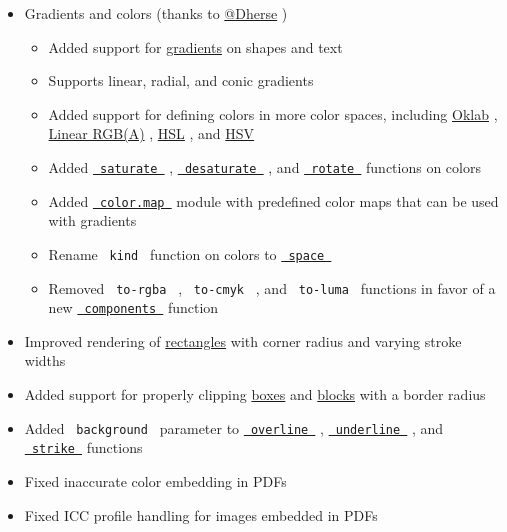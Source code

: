 \begin{itemize}
\tightlist
\item
  Gradients and colors (thanks to
  \href{https://github.com/Dherse}{@Dherse} )

  \begin{itemize}
  \tightlist
  \item
    Added support for
    \href{/docs/reference/visualize/gradient/}{gradients} on shapes and
    text
  \item
    Supports linear, radial, and conic gradients
  \item
    Added support for defining colors in more color spaces, including
    \href{/docs/reference/visualize/color/\#definitions-oklab}{Oklab} ,
    \href{/docs/reference/visualize/color/\#definitions-linear-rgb}{Linear
    RGB(A)} ,
    \href{/docs/reference/visualize/color/\#definitions-hsl}{HSL} , and
    \href{/docs/reference/visualize/color/\#definitions-hsv}{HSV}
  \item
    Added
    \href{/docs/reference/visualize/color/\#definitions-saturate}{\texttt{\ saturate\ }}
    ,
    \href{/docs/reference/visualize/color/\#definitions-desaturate}{\texttt{\ desaturate\ }}
    , and
    \href{/docs/reference/visualize/color/\#definitions-rotate}{\texttt{\ rotate\ }}
    functions on colors
  \item
    Added
    \href{/docs/reference/visualize/color/\#predefined-color-maps}{\texttt{\ color.map\ }}
    module with predefined color maps that can be used with gradients
  \item
    Rename \texttt{\ kind\ } function on colors to
    \href{/docs/reference/visualize/color/\#definitions-space}{\texttt{\ space\ }}
  \item
    Removed \texttt{\ to-rgba\ } , \texttt{\ to-cmyk\ } , and
    \texttt{\ to-luma\ } functions in favor of a new
    \href{/docs/reference/visualize/color/\#definitions-components}{\texttt{\ components\ }}
    function
  \end{itemize}
\item
  Improved rendering of
  \href{/docs/reference/visualize/rect/}{rectangles} with corner radius
  and varying stroke widths
\item
  Added support for properly clipping
  \href{/docs/reference/layout/box/\#parameters-clip}{boxes} and
  \href{/docs/reference/layout/block/\#parameters-clip}{blocks} with a
  border radius
\item
  Added \texttt{\ background\ } parameter to
  \href{/docs/reference/text/overline/}{\texttt{\ overline\ }} ,
  \href{/docs/reference/text/underline/}{\texttt{\ underline\ }} , and
  \href{/docs/reference/text/strike/}{\texttt{\ strike\ }} functions
\item
  Fixed inaccurate color embedding in PDFs
\item
  Fixed ICC profile handling for images embedded in PDFs
\end{itemize}

